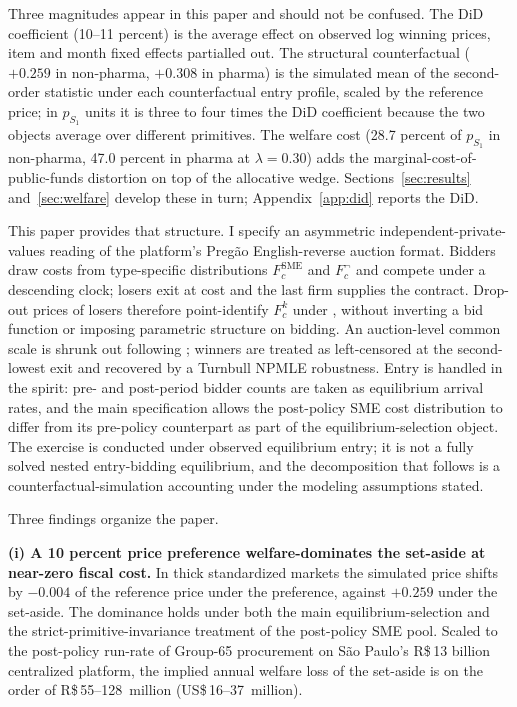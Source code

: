 Three magnitudes appear in this paper and should not be confused. The DiD coefficient (10--11 percent) is the average effect on observed log winning prices, item and month fixed effects partialled out. The structural counterfactual ($+0.259$ in non-pharma, $+0.308$ in pharma) is the simulated mean of the second-order statistic under each counterfactual entry profile, scaled by the reference price; in $p_{S_1}$ units it is three to four times the DiD coefficient because the two objects average over different primitives. The welfare cost (28.7 percent of $p_{S_1}$ in non-pharma, 47.0 percent in pharma at $\lambda = 0.30$) adds the marginal-cost-of-public-funds distortion on top of the allocative wedge. Sections~\ref{sec:results} and~\ref{sec:welfare} develop these in turn; Appendix~\ref{app:did} reports the DiD.

This paper provides that structure. I specify an asymmetric independent-private-values reading of the platform's Preg\~ao English-reverse auction format. Bidders draw costs from type-specific distributions $F_c^{\text{SME}}$ and $F_c^{\neg}$ and compete under a descending clock; losers exit at cost and the last firm supplies the contract. Drop-out prices of losers therefore point-identify $F_c^k$ under \citet{haile2003}, without inverting a bid function or imposing parametric structure on bidding. An auction-level common scale is shrunk out following \citet{krasnokutskaya2011}; winners are treated as left-censored at the second-lowest exit and recovered by a Turnbull NPMLE robustness. Entry is handled in the \citet{atheyseira2011} spirit: pre- and post-period bidder counts are taken as equilibrium arrival rates, and the main specification allows the post-policy SME cost distribution to differ from its pre-policy counterpart as part of the equilibrium-selection object. The exercise is conducted under observed equilibrium entry; it is not a fully solved nested entry-bidding equilibrium, and the decomposition that follows is a counterfactual-simulation accounting under the modeling assumptions stated.

Three findings organize the paper.

\noindent\textbf{(i) A 10 percent price preference welfare-dominates the set-aside at near-zero fiscal cost.} In thick standardized markets the simulated price shifts by $-0.004$ of the reference price under the preference, against $+0.259$ under the set-aside. The dominance holds under both the main equilibrium-selection and the strict-primitive-invariance treatment of the post-policy SME pool. Scaled to the post-policy run-rate of Group-65 procurement on São Paulo's R\$\,13 billion centralized platform, the implied annual welfare loss of the set-aside is on the order of R\$\,55--128~million (US\$\,16--37~million).

